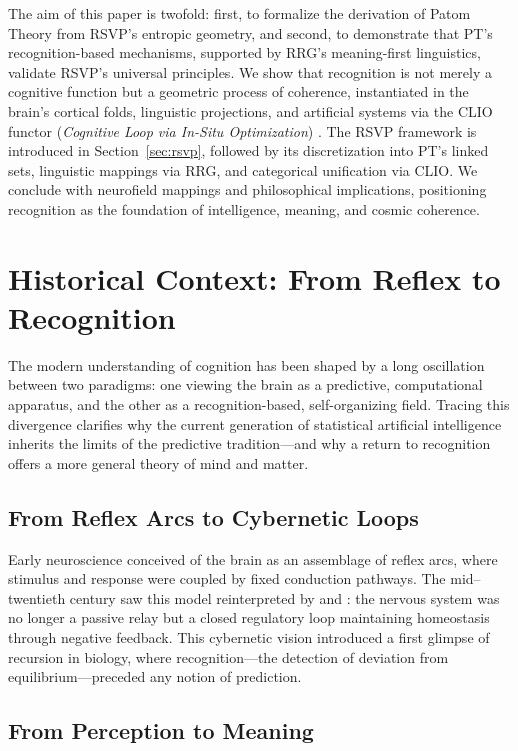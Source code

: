 \documentclass[11pt]{article}
\begin{document}
The aim of this paper is twofold: first, to formalize the derivation of Patom Theory from RSVP’s entropic geometry, and second, to demonstrate that PT’s recognition-based mechanisms, supported by RRG’s meaning-first linguistics, validate RSVP’s universal principles. We show that recognition is not merely a cognitive function but a geometric process of coherence, instantiated in the brain’s cortical folds, linguistic projections, and artificial systems via the CLIO functor (\textit{Cognitive Loop via In-Situ Optimization}) \citep{cheng2025clio}. The RSVP framework is introduced in Section~\ref{sec:rsvp}, followed by its discretization into PT’s linked sets, linguistic mappings via RRG, and categorical unification via CLIO. We conclude with neurofield mappings and philosophical implications, positioning recognition as the foundation of intelligence, meaning, and cosmic coherence.

\section{Historical Context: From Reflex to Recognition}

The modern understanding of cognition has been shaped by a long oscillation
between two paradigms: one viewing the brain as a predictive, computational
apparatus, and the other as a recognition-based, self-organizing field.  
Tracing this divergence clarifies why the current generation of
statistical artificial intelligence inherits the limits of the predictive
tradition—and why a return to recognition offers a more general theory of
mind and matter.

\subsection{From Reflex Arcs to Cybernetic Loops}

Early neuroscience conceived of the brain as an assemblage of reflex arcs,
where stimulus and response were coupled by fixed conduction pathways.
The mid–twentieth century saw this model reinterpreted by
\citet{ashby1956cybernetics} and \citet{rosen1991lifemodel}:
the nervous system was no longer a passive relay but a closed regulatory
loop maintaining homeostasis through negative feedback.
This cybernetic vision introduced a first glimpse of recursion in biology,
where recognition—the detection of deviation from equilibrium—preceded
any notion of prediction.

\subsection{From Perception to Meaning}
\end{document}
